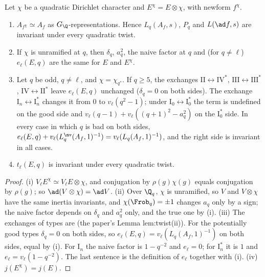 \begin{proposition}\label{prop:lfunctions:twists}
Let $\chi$ be a quadratic Dirichlet character and $E^\chi=E\otimes\chi$, with newform $f^\chi$.
\begin{enumerate}[label=(\roman*)]
\item $A_{f^\chi}\simeq A_f$ as $G_\Q$-representations. Hence $L_q(A_f,s)$, $P_q$ and $L(\ad f,s)$ are invariant under every quadratic twist.
\item If $\chi$ is unramified at $q$, then $\delta_q$, $a_q^2$, the naive factor at $q$ and (for $q\ne\ell$) $e_\ell(E,q)$ are the same for $E$ and $E^\chi$.
\item Let $q$ be odd, $q\ne\ell$, and $\chi=\chi_{q^*}$. If $q\ge5$, the exchanges $\mathrm{II}\leftrightarrow\mathrm{IV}^*$, $\mathrm{III}\leftrightarrow\mathrm{III}^*$, $\mathrm{IV}\leftrightarrow\mathrm{II}^*$ leave
$e_\ell(E,q)$ unchanged ($\delta_q=0$ on both sides). The exchange $\mathrm I_n\leftrightarrow\mathrm I_n^*$ changes it from $0$ to $v_\ell(q^2-1)$; under $\mathrm I_0\leftrightarrow\mathrm I_0^*$ the
term is undefined on the good side and $v_\ell(q-1)+v_\ell((q+1)^2-a_q^2)$ on the $\mathrm I_0^*$ side. In every case in which $q$ is bad on both sides,
$e_\ell(E,q)+v_\ell(L_q^{\nv}(A_f,1)^{-1})=v_\ell(L_q(A_f,1)^{-1})$, and the right side is invariant in all cases.
\item $t_\ell(E,q)$ is invariant under every quadratic twist.
\end{enumerate}
\end{proposition}

\begin{proof}
(i) $V_\ell E^\chi\simeq V_\ell E\otimes\chi$, and conjugation by $\rho(g)\chi(g)$ equals conjugation by $\rho(g)$; so $\ad(V\otimes\chi)=\ad V$. (ii) Over $\Q_q$, $\chi$ is unramified, so $V$ and
$V\otimes\chi$ have the same inertia invariants, and $\chi(\Frob_q)=\pm1$ changes $a_q$ only by a sign; the naive factor depends on $\delta_q$ and $a_q^2$ only, and the true one by
(i). (iii) The exchanges of types are  (the paper's Lemma lem:twist(ii)). For the potentially good types $\delta_q=0$ on both sides, so $e_\ell(E,q)=v_\ell(L_q(A_f,1)^{-1})$
on both sides, equal by (i). For $\mathrm I_n$ the naive factor is $1-q^{-2}$ and $e_\ell=0$; for $\mathrm I_n^*$ it is $1$ and $e_\ell=v_\ell(1-q^{-2})$. The last sentence is the definition of
$e_\ell$ together with (i). (iv) $j(E^\chi)=j(E)$.
\end{proof}

